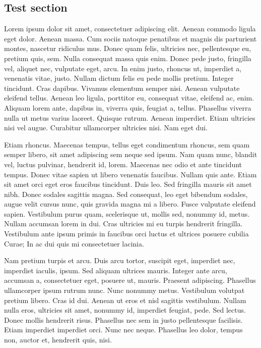 \begin{multicols}{2}
\section{Test section}
Lorem ipsum dolor sit amet, consectetuer adipiscing elit. Aenean
commodo ligula eget dolor. Aenean massa. Cum sociis natoque penatibus
et magnis dis parturient montes, nascetur ridiculus mus. Donec quam
felis, ultricies nec, pellentesque eu, pretium quis, sem. Nulla
consequat massa quis enim. Donec pede justo, fringilla vel, aliquet
nec, vulputate eget, arcu. In enim justo, rhoncus ut, imperdiet a,
venenatis vitae, justo. Nullam dictum felis eu pede mollis pretium.
Integer tincidunt. Cras dapibus. Vivamus elementum semper nisi. Aenean
vulputate eleifend tellus. Aenean leo ligula, porttitor eu, consequat
vitae, eleifend ac, enim. Aliquam lorem ante, dapibus in, viverra
quis, feugiat a, tellus. Phasellus viverra nulla ut metus varius
laoreet. Quisque rutrum. Aenean imperdiet. Etiam ultricies nisi vel
augue. Curabitur ullamcorper ultricies nisi. Nam eget dui.

Etiam rhoncus. Maecenas tempus, tellus eget condimentum rhoncus, sem
quam semper libero, sit amet adipiscing sem neque sed ipsum. Nam quam
nunc, blandit vel, luctus pulvinar, hendrerit id, lorem. Maecenas nec
odio et ante tincidunt tempus. Donec vitae sapien ut libero venenatis
faucibus. Nullam quis ante. Etiam sit amet orci eget eros faucibus
tincidunt. Duis leo. Sed fringilla mauris sit amet nibh. Donec sodales
sagittis magna. Sed consequat, leo eget bibendum sodales, augue velit
cursus nunc, quis gravida magna mi a libero. Fusce vulputate eleifend
sapien. Vestibulum purus quam, scelerisque ut, mollis sed, nonummy id,
metus. Nullam accumsan lorem in dui. Cras ultricies mi eu turpis
hendrerit fringilla. Vestibulum ante ipsum primis in faucibus orci
luctus et ultrices posuere cubilia Curae; In ac dui quis mi
consectetuer lacinia.

Nam pretium turpis et arcu. Duis arcu tortor, suscipit eget, imperdiet
nec, imperdiet iaculis, ipsum. Sed aliquam ultrices mauris. Integer
ante arcu, accumsan a, consectetuer eget, posuere ut, mauris. Praesent
adipiscing. Phasellus ullamcorper ipsum rutrum nunc. Nunc nonummy
metus. Vestibulum volutpat pretium libero. Cras id dui. Aenean ut eros
et nisl sagittis vestibulum. Nullam nulla eros, ultricies sit amet,
nonummy id, imperdiet feugiat, pede. Sed lectus. Donec mollis
hendrerit risus. Phasellus nec sem in justo pellentesque facilisis.
Etiam imperdiet imperdiet orci. Nunc nec neque. Phasellus leo dolor,
tempus non, auctor et, hendrerit quis, nisi.


\end{multicols}
